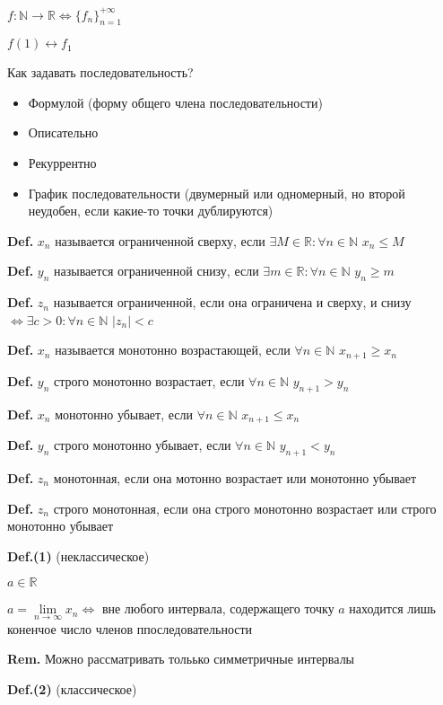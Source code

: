 \documentclass[14pt, letter paper]{article}
\begin{document}
$f: \mathds{N} \rightarrow \mathds{R} \Leftrightarrow \{f_n\}_{n=1}^{+\infty}$

$f(1) \leftrightarrow f_1$

Как задавать последовательность?

\begin{itemize}
    \item Формулой (форму общего члена последовательности)
    \item Описательно
    \item Рекуррентно
    \item График последовательности (двумерный или одномерный, но второй неудобен, если какие-то точки дублируются)
\end{itemize}

\textbf{Def.} $x_n$ называется ограниченной сверху, если $\exists M \in \mathds{R}: \forall n \in \mathds{N}$ $x_n \leq M$

\textbf{Def.} $y_n$ называется ограниченной снизу, если $\exists m \in \mathds{R} : \forall n \in \mathds{N}$ $y_n \geq m$

\textbf{Def.} $z_n$ называется ограниченной, если она ограничена и сверху, и снизу $\Leftrightarrow \exists c > 0 : \forall n \in \mathds{N}$ $|z_n| < c$
 
\textbf{Def.} $x_n$ называется монотонно возрастающей, если $\forall n \in \mathds{N}$ $x_{n+1} \geq x_n$

\textbf{Def.} $y_n$ строго монотонно возрастает, если $\forall n \in \mathds{N}$ $y_{n+1} > y_n$

\textbf{Def.} $x_n$ монотонно убывает, если $\forall n \in \mathds{N}$ $x_{n+1} \leq x_n$

\textbf{Def.} $y_n$ строго монотонно убывает, если $\forall n \in \mathds{N}$ $y_{n+1} < y_n$

\textbf{Def.} $z_n$ монотонная, если она мотонно возрастает или монотонно убывает

\textbf{Def.} $z_n$ строго монотонная, если она строго монотонно возрастает или строго монотонно убывает

\textbf{Def.(1)} (неклассическое)

$a \in \mathds{R}$

$a = \lim\limits_{n \rightarrow \infty}{x_n} \Leftrightarrow$ вне любого интервала, содержащего точку $a$ находится лишь коненчое число членов ппоследовательности

\textbf{Rem.} Можно рассматривать тольько симметричные интервалы

\textbf{Def.(2)} (классическое)
\end{document}
